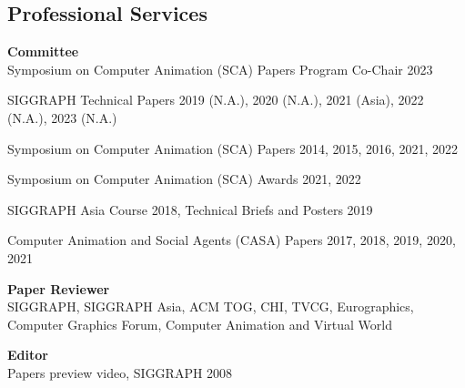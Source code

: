 \documentclass[margin,line]{res}
\begin{document}
\begin{resume}

\section{\sc Professional Services}
{\bf Committee} \\
Symposium on Computer Animation (SCA) Papers Program Co-Chair 2023

\vspace*{-.15in}
SIGGRAPH Technical Papers 2019 (N.A.), 2020 (N.A.), 2021 (Asia), 2022 (N.A.), 2023 (N.A.)

\vspace*{-.15in}
Symposium on Computer Animation (SCA) Papers 2014, 2015, 2016, 2021, 2022

\vspace*{-.15in}
Symposium on Computer Animation (SCA) Awards 2021, 2022

\vspace*{-.15in}
SIGGRAPH Asia Course 2018, Technical Briefs and Posters 2019 

\vspace*{-.15in}
Computer Animation and Social Agents (CASA) Papers 2017, 2018, 2019, 2020, 2021

\vspace*{-.1in}
{\bf Paper Reviewer} \\
SIGGRAPH, SIGGRAPH Asia, ACM TOG, CHI, TVCG, Eurographics, Computer Graphics Forum, Computer Animation and Virtual World


\vspace*{-.1in}
{\bf Editor} \\
Papers preview video, SIGGRAPH 2008



\end{resume}
\end{document}

